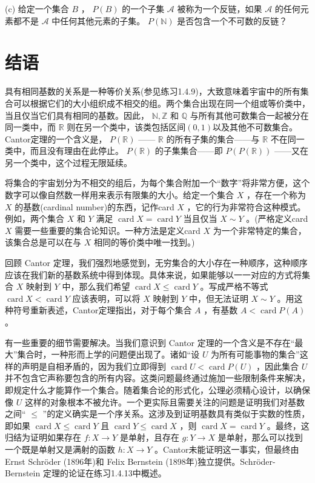 (c) 给定一个集合 \(B\) ， \(P\left( B\right)\) 的一个子集 \(\mathcal{A}\) 被称为一个反链，如果 \(\mathcal{A}\) 的任何元素都不是 \(\mathcal{A}\) 中任何其他元素的子集。 \(P\left( \mathbb{N}\right)\) 是否包含一个不可数的反链？

\section{结语}
\label{sec:1.6}
具有相同基数的关系是一种等价关系(参见练习1.4.9)，大致意味着宇宙中的所有集合可以根据它们的大小组织成不相交的组。两个集合出现在同一个组或等价类中，当且仅当它们具有相同的基数。因此， \(\mathbb{N},\mathbb{Z}\) 和 \(\mathbb{Q}\) 与所有其他可数集合一起被分在同一类中，而 \(\mathbb{R}\) 则在另一个类中，该类包括区间$(0,1)$以及其他不可数集合。Cantor定理的一个含义是， \(P\left( \mathbb{R}\right)\) —— \(\mathbb{R}\) 的所有子集的集合——与 \(\mathbb{R}\) 不在同一类中，而且没有理由在此停止。 \(P\left( \mathbb{R}\right)\) 的子集集合——即 \(P\left( {P\left( \mathbb{R}\right) }\right)\) ——又在另一个类中，这个过程无限延续。

将集合的宇宙划分为不相交的组后，为每个集合附加一个“数字”将非常方便，这个数字可以像自然数一样用来表示有限集的大小。给定一个集合 \(X\) ，存在一个称为 \(X\) 的基数(cardinal number)的东西，记作card \(X\) ，它的行为非常符合这种模式。例如，两个集合 \(X\) 和 \(Y\) 满足 \(\operatorname{card}X = \operatorname{card}Y\) 当且仅当 \(X \sim  Y\) 。(严格定义card \(X\) 需要一些重要的集合论知识。一种方法是定义card \(X\) 为一个非常特定的集合，该集合总是可以在与 \(X\) 相同的等价类中唯一找到。)

回顾 Cantor 定理，我们强烈地感觉到，无穷集合的大小存在一种顺序，这种顺序应该在我们新的基数系统中得到体现。具体来说，如果能够以一一对应的方式将集合 \(X\) 映射到 \(Y\) 中，那么我们希望 \(\operatorname{card}X \leq  \operatorname{card}Y\) 。写成严格不等式 \(\operatorname{card}X < \operatorname{card}Y\) 应该表明，可以将 \(X\) 映射到 \(Y\) 中，但无法证明 \(X \sim  Y\) 。用这种符号重新表述，Cantor定理指出，对于每个集合 \(A\) ，有基数 \(A < \operatorname{card}P\left( A\right)\) 。

有一些重要的细节需要解决。当我们意识到 Cantor 定理的一个含义是不存在“最大”集合时，一种形而上学的问题便出现了。诸如“设 \(U\) 为所有可能事物的集合”这样的声明是自相矛盾的，因为我们立即得到 \(\operatorname{card}U < \operatorname{card}P\left( U\right)\) ，因此集合 \(U\) 并不包含它声称要包含的所有内容。这类问题最终通过施加一些限制条件来解决，即规定什么才能算作一个集合。随着集合论的形式化，公理必须精心设计，以确保像 \(U\) 这样的对象根本不被允许。一个更实际且需要关注的问题是证明我们对基数之间“ \(\leq\) ”的定义确实是一个序关系。这涉及到证明基数具有类似于实数的性质，即如果 \(\operatorname{card}X \leq  \operatorname{card}Y\) 且 \(\operatorname{card}Y \leq  \operatorname{card}X\) ，则 \(\operatorname{card}X = \operatorname{card}Y\) 。最终，这归结为证明如果存在 \(f : X \rightarrow  Y\) 是单射，且存在 \(g : Y \rightarrow  X\) 是单射，那么可以找到一个既是单射又是满射的函数 \(h : X \rightarrow  Y\) 。Cantor未能证明这一事实，但最终由 Ernst Schröder (1896年)和 Felix Bernstein (1898年)独立提供。Schröder-Bernstein 定理的论证在练习1.4.13中概述。

